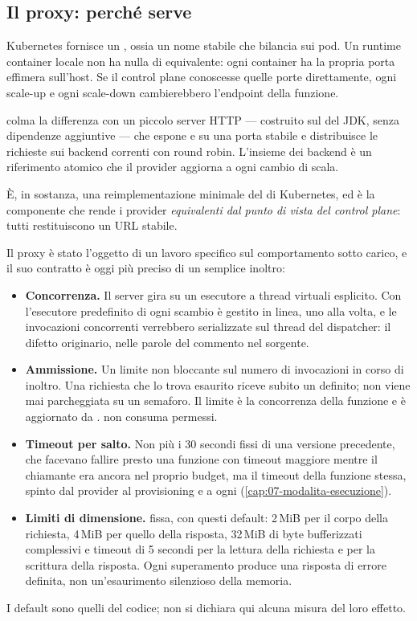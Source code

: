 \subsection{Il proxy: perch\'e serve}

Kubernetes fornisce un , ossia un nome stabile che bilancia sui
pod. Un runtime container locale non ha nulla di equivalente: ogni container ha
la propria porta effimera sull'host. Se il control plane conoscesse quelle porte
direttamente, ogni scale-up e ogni scale-down cambierebbero l'endpoint della
funzione.

 colma la differenza con un piccolo server HTTP ---
costruito sul  del JDK, senza dipendenze aggiuntive --- che
espone  e  su una porta stabile e distribuisce le
richieste sui backend correnti con round robin. L'insieme dei backend \`e un
riferimento atomico che il provider aggiorna a ogni cambio di scala.

\`E, in sostanza, una reimplementazione minimale del  di
Kubernetes, ed \`e la componente che rende i provider \emph{equivalenti dal
punto di vista del control plane}: tutti restituiscono un URL stabile.

Il proxy \`e stato l'oggetto di un lavoro specifico sul comportamento sotto
carico, e il suo contratto \`e oggi pi\`u preciso di un semplice inoltro:
\begin{itemize}
\item \textbf{Concorrenza.} Il server gira su un esecutore a thread virtuali
esplicito. Con l'esecutore predefinito di  ogni scambio \`e
gestito in linea, uno alla volta, e le invocazioni concorrenti verrebbero
serializzate sul thread del dispatcher: il difetto originario, nelle parole del
commento nel sorgente.
\item \textbf{Ammissione.} Un limite non bloccante sul numero di invocazioni in
corso di inoltro. Una richiesta che lo trova esaurito riceve subito un 
definito; non viene mai parcheggiata su un semaforo. Il limite \`e la
concorrenza della funzione e \`e aggiornato da . 
non consuma permessi.
\item \textbf{Timeout per salto.} Non pi\`u i 30 secondi fissi di una versione
precedente, che facevano fallire presto una funzione con timeout maggiore mentre
il chiamante era ancora nel proprio budget, ma il timeout della funzione stessa,
spinto dal provider al provisioning e a ogni 
(\cref{cap:07-modalita-esecuzione}).
\item \textbf{Limiti di dimensione.}  fissa, con questi
default: 2\,MiB per il corpo della richiesta, 4\,MiB per quello della risposta,
32\,MiB di byte bufferizzati complessivi e timeout di 5 secondi per la lettura
della richiesta e per la scrittura della risposta. Ogni superamento produce una
risposta di errore definita, non un'esaurimento silenzioso della memoria.
\end{itemize}
I default sono quelli del codice; non si dichiara qui alcuna misura del loro
effetto.

